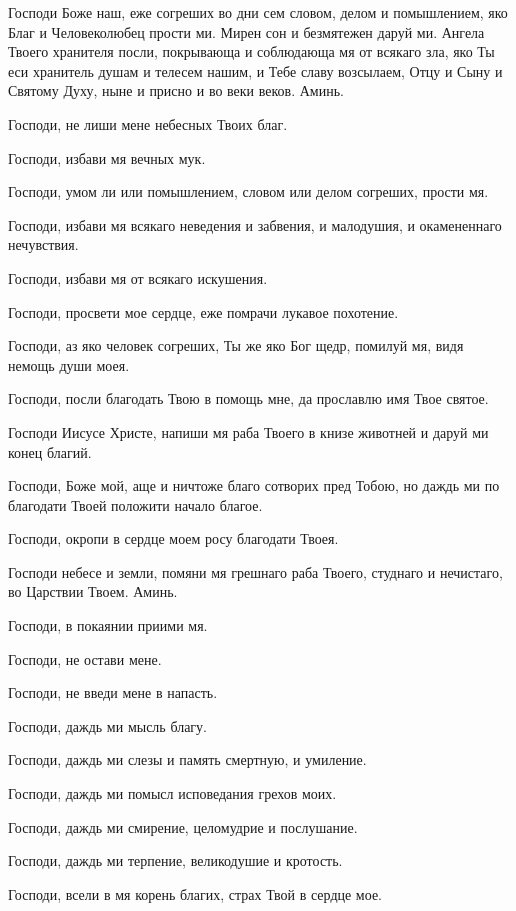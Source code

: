 \begin{mymulticols}


Господи Боже наш, еже согреших во дни сем словом, делом и помышлением, яко Благ и Человеколюбец прости ми. Мирен сон и безмятежен даруй ми. Ангела Твоего хранителя посли, покрывающа и соблюдающа мя от всякаго зла, яко Ты еси хранитель душам и телесем нашим, и Тебе славу возсылаем, Отцу и Сыну и Святому Духу, ныне и присно и во веки веков. Аминь.



Господи, не лиши мене небесных Твоих благ.

Господи, избави мя вечных мук.

Господи, умом ли или помышлением, словом или делом согреших, прости мя.

Господи, избави мя всякаго неведения и забвения, и малодушия, и окамененнаго нечувствия.

Господи, избави мя от всякаго искушения.

Господи, просвети мое сердце, еже помрачи лукавое похотение.

Господи, аз яко человек согреших, Ты же яко Бог щедр, помилуй мя, видя немощь души моея.

Господи, посли благодать Твою в помощь мне, да прославлю имя Твое святое.

Господи Иисусе Христе, напиши мя раба Твоего в книзе животней и даруй ми конец благий.

Господи, Боже мой, аще и ничтоже благо сотворих пред Тобою, но даждь ми по благодати Твоей положити начало благое.

Господи, окропи в сердце моем росу благодати Твоея.

Господи небесе и земли, помяни мя грешнаго раба Твоего, студнаго и нечистаго, во Царствии Твоем. Аминь.

Господи, в покаянии приими мя.

Господи, не остави мене.

Господи, не введи мене в напасть.

Господи, даждь ми мысль благу.

Господи, даждь ми слезы и память смертную, и умиление.

Господи, даждь ми помысл исповедания грехов моих.

Господи, даждь ми смирение, целомудрие и послушание.

Господи, даждь ми терпение, великодушие и кротость.

Господи, всели в мя корень благих, страх Твой в сердце мое.


\end{mymulticols}
